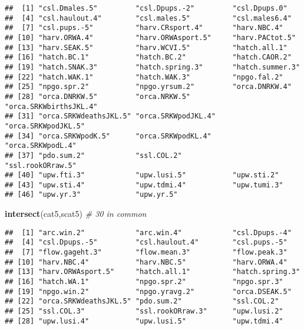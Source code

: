 \documentclass[]{article}
\newenvironment{Shaded}{\begin{snugshade}}{\end{snugshade}}
\newcommand{\KeywordTok}[1]{\textcolor[rgb]{0.13,0.29,0.53}{\textbf{{#1}}}}
\newcommand{\CommentTok}[1]{\textcolor[rgb]{0.56,0.35,0.01}{\textit{{#1}}}}
\newcommand{\NormalTok}[1]{{#1}}
\begin{document}
\begin{verbatim}
##  [1] "csl.Dmales.5"         "csl.Dpups.-2"         "csl.Dpups.0"         
##  [4] "csl.haulout.4"        "csl.males.5"          "csl.males6.4"        
##  [7] "csl.pups.-5"          "harv.CRsport.4"       "harv.NBC.4"          
## [10] "harv.ORWA.4"          "harv.ORWAsport.5"     "harv.PACtot.5"       
## [13] "harv.SEAK.5"          "harv.WCVI.5"          "hatch.all.1"         
## [16] "hatch.BC.1"           "hatch.BC.2"           "hatch.CAOR.2"        
## [19] "hatch.SNAK.3"         "hatch.spring.3"       "hatch.summer.3"      
## [22] "hatch.WAK.1"          "hatch.WAK.3"          "npgo.fal.2"          
## [25] "npgo.spr.2"           "npgo.yrsum.2"         "orca.DNRKW.4"        
## [28] "orca.DNRKW.5"         "orca.NRKW.5"          "orca.SRKWbirthsJKL.4"
## [31] "orca.SRKWdeathsJKL.5" "orca.SRKWpodJKL.4"    "orca.SRKWpodJKL.5"   
## [34] "orca.SRKWpodK.5"      "orca.SRKWpodKL.4"     "orca.SRKWpodL.4"     
## [37] "pdo.sum.2"            "ssl.COL.2"            "ssl.rookORraw.5"     
## [40] "upw.fti.3"            "upw.lusi.5"           "upw.sti.2"           
## [43] "upw.sti.4"            "upw.tdmi.4"           "upw.tumi.3"          
## [46] "upw.yr.3"             "upw.yr.5"
\end{verbatim}

\begin{Shaded}
\begin{Highlighting}[]
\KeywordTok{intersect}\NormalTok{(cat5,scat5) }\CommentTok{# 30 in common }
\end{Highlighting}
\end{Shaded}

\begin{verbatim}
##  [1] "arc.win.2"            "arc.win.4"            "csl.Dpups.-4"        
##  [4] "csl.Dpups.-5"         "csl.haulout.4"        "csl.pups.-5"         
##  [7] "flow.gageht.3"        "flow.mean.3"          "flow.peak.3"         
## [10] "harv.NBC.4"           "harv.NBC.5"           "harv.ORWA.4"         
## [13] "harv.ORWAsport.5"     "hatch.all.1"          "hatch.spring.3"      
## [16] "hatch.WA.1"           "npgo.spr.2"           "npgo.spr.3"          
## [19] "npgo.win.2"           "npgo.yravg.2"         "orca.DSEAK.5"        
## [22] "orca.SRKWdeathsJKL.5" "pdo.sum.2"            "ssl.COL.2"           
## [25] "ssl.COL.3"            "ssl.rookORraw.3"      "upw.lusi.2"          
## [28] "upw.lusi.4"           "upw.lusi.5"           "upw.tdmi.4"
\end{verbatim}
\end{document}
